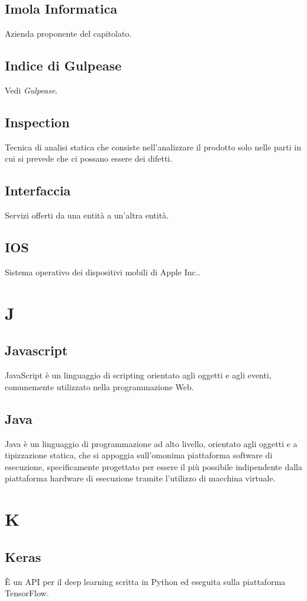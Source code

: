 \subsection{Imola Informatica} Azienda proponente del capitolato.
\subsection{Indice di Gulpease} Vedi \textit{Gulpease}.
\subsection{Inspection} Tecnica di analisi statica che consiste nell’analizzare il prodotto solo nelle parti in cui si prevede che ci possano essere dei difetti.
\subsection{Interfaccia} Servizi offerti da una entità a un'altra entità.
\subsection{IOS} Sistema operativo dei dispositivi mobili di Apple Inc..
\newpage \section{J}
\subsection{Javascript} JavaScript è un linguaggio di scripting orientato agli oggetti e agli eventi, comunemente utilizzato nella programmazione Web.
\subsection{Java} Java è un linguaggio di programmazione ad alto livello, orientato agli oggetti e a tipizzazione statica, che si appoggia sull’omonima piattaforma software di esecuzione, specificamente progettato per essere il più possibile indipendente dalla piattaforma hardware di esecuzione tramite l’utilizzo di macchina virtuale.
\newpage \section{K}
\subsection{Keras} È un API per il deep learning scritta in Python ed eseguita sulla piattaforma TensorFlow.
